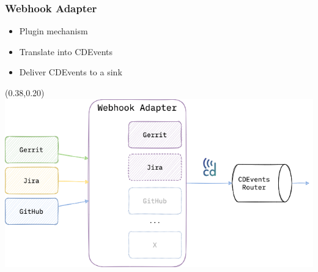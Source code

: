 \documentclass[aspectratio=169,11pt,hyperref={colorlinks=true}]{beamer}
\begin{document}

\begin{grayframe}
  \frametitle{Webhook Adapter}
  \begin{itemize}
    \item Plugin mechanism
    \item Translate into CDEvents
    \item Deliver CDEvents to a sink
  \end{itemize}
  \begin{textblock*}{0.60\paperwidth}(0.38\paperwidth,0.20\paperheight)
    \includegraphics[width=0.60\paperwidth]{img/cdevents-webhook_adapter.png}
  \end{textblock*}
\end{grayframe}
\end{document}
